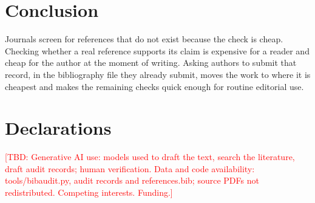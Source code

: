 \documentclass[11pt]{article}
\newcommand{\TBD}[1]{\textcolor{red}{[TBD: #1]}}
\begin{document}
\section{Conclusion}

Journals screen for references that do not exist because the check is cheap. Checking whether a real reference supports its claim is expensive for a reader and cheap for the author at the moment of writing. Asking authors to submit that record, in the bibliography file they already submit, moves the work to where it is cheapest and makes the remaining checks quick enough for routine editorial use.

\section*{Declarations}
\TBD{Generative AI use: models used to draft the text, search the literature, draft audit records; human verification. Data and code availability: tools/bibaudit.py, audit records and references.bib; source PDFs not redistributed. Competing interests. Funding.}



\end{document}
